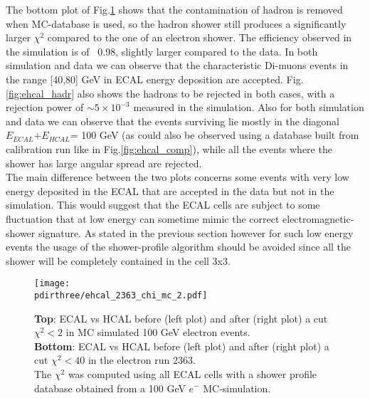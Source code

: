 The bottom plot of Fig.\ref{fig:ehcal_elec} shows that the
contamination of hadron is removed when MC-database is used, so
the hadron shower still produces a significantly larger $\chi^{2}$
compared to the one of an electron shower. The efficiency
observed in the simulation is of ~0.98, slightly larger compared to the data. 
In both simulation and data we can observe that the characteristic
Di-muons events in the range [40,80] GeV in ECAL energy
deposition are accepted.
Fig.\ref{fig:ehcal_hadr} also shows the hadrons to be rejected in both
cases, with a rejection power of $\sim 5\times 10^{-3}$ measured in the
simulation. Also for both simulation and data we can observe that the
events surviving lie mostly in the diagonal $E_{ECAL}$+$E_{HCAL}$= 100
GeV (as could also be observed using a database built from calibration run like in Fig.\ref{fig:ehcal_comp}), while all the events where the shower has large angular spread are rejected.
\\
The main difference between the two plots concerns some events with very low energy deposited in the ECAL that are accepted in the data but not in the simulation. This would suggest that the ECAL cells are subject to some fluctuation that at low energy can sometime mimic the correct electromagnetic-shower signature. As stated in the previous section however for such low energy events the usage of the shower-profile algorithm should be avoided since all the shower will be completely contained in the cell 3x3.\\


\begin{figure}[h!]
  \begin{center}
    \texttt{[image: \\pdirthree/ehcal\_2363\_chi\_mc\_2.pdf]}
  \end{center}
  \caption{\textbf{Top}: ECAL vs HCAL before (left plot) and
    after (right plot) a cut
    $\chi^2<2$ in MC simulated 100 GeV electron events. \\
    \textbf{Bottom}: ECAL vs HCAL before (left plot) and after (right
    plot) a cut
    $\chi^2<40$ in the electron run 2363.\\
    The $\chi^2$ was computed using all ECAL cells with a shower
    profile database obtained from a 100 GeV $e^-$ MC-simulation. }
  \label{fig:ehcal_elec}
\end{figure}

